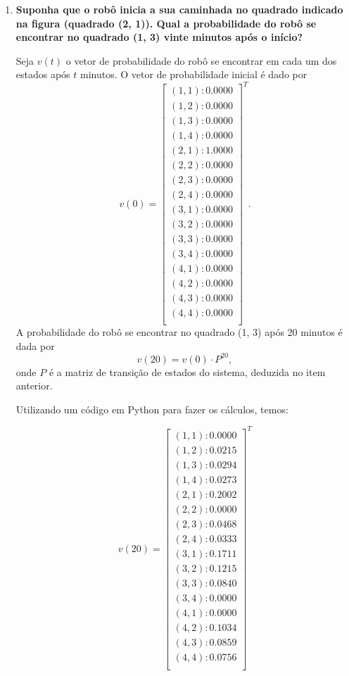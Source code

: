 \begin{enumerate}
    \item \textbf{Suponha que o robô inicia a sua caminhada no quadrado indicado na figura (quadrado (2, 1)). Qual a probabilidade do robô se encontrar no quadrado (1, 3) vinte minutos após o início?}
    
    Seja $v(t)$ o vetor de probabilidade do robô se encontrar em cada um dos estados após $t$ minutos. O vetor de probabilidade inicial é dado por 
    $$
    v(0) = \begin{bmatrix}
        (1,1): 0.0000\\
        (1,2): 0.0000\\
        (1,3): 0.0000\\
        (1,4): 0.0000\\
        (2,1): 1.0000\\
        (2,2): 0.0000\\
        (2,3): 0.0000\\
        (2,4): 0.0000\\
        (3,1): 0.0000\\
        (3,2): 0.0000\\
        (3,3): 0.0000\\
        (3,4): 0.0000\\
        (4,1): 0.0000\\
        (4,2): 0.0000\\
        (4,3): 0.0000\\
        (4,4): 0.0000\\
    \end{bmatrix}^T.
    $$
     A probabilidade do robô se encontrar no quadrado (1, 3) após 20 minutos é dada por 
    $$v(20) = v(0) \cdot P^{20},$$
    onde $P$ é a matriz de transição de estados do sistema, deduzida no item anterior.

    Utilizando um código em Python para fazer os cálculos, temos:

    $$
    v(20) = \begin{bmatrix}
        (1,1): 0.0000\\
        (1,2): 0.0215\\
        (1,3): 0.0294\\
        (1,4): 0.0273\\
        (2,1): 0.2002\\
        (2,2): 0.0000\\
        (2,3): 0.0468\\
        (2,4): 0.0333\\
        (3,1): 0.1711\\
        (3,2): 0.1215\\
        (3,3): 0.0840\\
        (3,4): 0.0000\\
        (4,1): 0.0000\\
        (4,2): 0.1034\\
        (4,3): 0.0859\\
        (4,4): 0.0756\\
    \end{bmatrix}^T
    $$


\end{enumerate}
